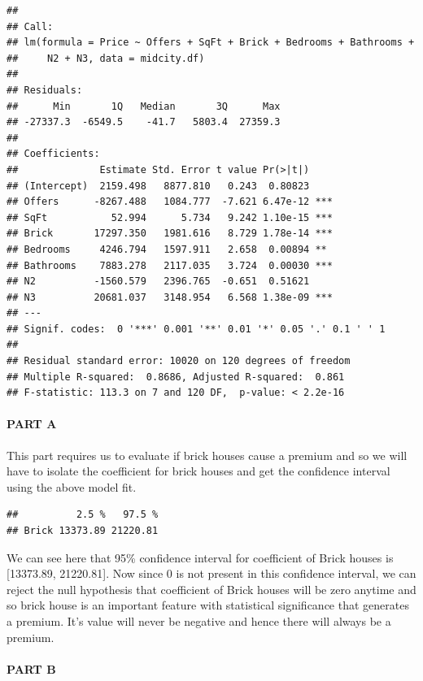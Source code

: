 \documentclass[
]{article}
\begin{document}
\begin{verbatim}
## 
## Call:
## lm(formula = Price ~ Offers + SqFt + Brick + Bedrooms + Bathrooms + 
##     N2 + N3, data = midcity.df)
## 
## Residuals:
##      Min       1Q   Median       3Q      Max 
## -27337.3  -6549.5    -41.7   5803.4  27359.3 
## 
## Coefficients:
##              Estimate Std. Error t value Pr(>|t|)    
## (Intercept)  2159.498   8877.810   0.243  0.80823    
## Offers      -8267.488   1084.777  -7.621 6.47e-12 ***
## SqFt           52.994      5.734   9.242 1.10e-15 ***
## Brick       17297.350   1981.616   8.729 1.78e-14 ***
## Bedrooms     4246.794   1597.911   2.658  0.00894 ** 
## Bathrooms    7883.278   2117.035   3.724  0.00030 ***
## N2          -1560.579   2396.765  -0.651  0.51621    
## N3          20681.037   3148.954   6.568 1.38e-09 ***
## ---
## Signif. codes:  0 '***' 0.001 '**' 0.01 '*' 0.05 '.' 0.1 ' ' 1
## 
## Residual standard error: 10020 on 120 degrees of freedom
## Multiple R-squared:  0.8686, Adjusted R-squared:  0.861 
## F-statistic: 113.3 on 7 and 120 DF,  p-value: < 2.2e-16
\end{verbatim}

\hypertarget{part-a-7}{%
\paragraph{\texorpdfstring{{PART A}}{PART A}}\label{part-a-7}}

This part requires us to evaluate if brick houses cause a premium and so
we will have to isolate the coefficient for brick houses and get the
confidence interval using the above model fit.

\begin{verbatim}
##          2.5 %   97.5 %
## Brick 13373.89 21220.81
\end{verbatim}

We can see here that 95\% confidence interval for coefficient of Brick
houses is {[}13373.89, 21220.81{]}. Now since 0 is not present in this
confidence interval, we can reject the null hypothesis that coefficient
of Brick houses will be zero anytime and so brick house is an important
feature with statistical significance that generates a premium. It's
value will never be negative and hence there will always be a premium.

\hypertarget{part-b-7}{%
\paragraph{\texorpdfstring{{PART B}}{PART B}}\label{part-b-7}}
\end{document}

